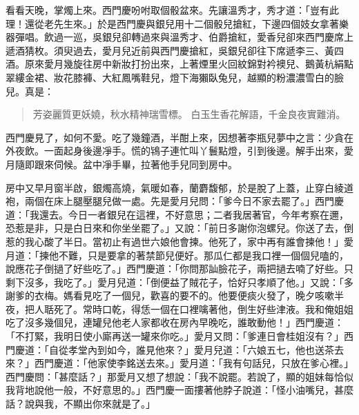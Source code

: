 看看天晚，掌燭上來。西門慶吩咐取個骰盆來。先讓溫秀才，秀才道：「豈有此理！還從老先生來。」於是西門慶與銀兒用十二個骰兒搶紅，下邊四個妓女拿著樂器彈唱。飲過一巡，吳銀兒卻轉過來與溫秀才、伯爵搶紅，愛香兒卻來西門慶席上遞酒猜枚。須臾過去，愛月兒近前與西門慶搶紅，吳銀兒卻往下席遞李三、黃四酒。原來愛月幾旋往房中新妝打扮出來，上著煙里火回紋錦對衿襖兒、鵝黃杭絹點翠縷金裙、妝花膝褲、大紅鳳嘴鞋兒，燈下海獺臥兔兒，越顯的粉濃濃雪白的臉兒。真是：
\begin{quote}
芳姿麗質更妖嬈，秋水精神瑞雪標。
白玉生香花解語，千金良夜實難消。
\end{quote}

西門慶見了，如何不愛。吃了幾鐘酒，半酣上來，因想著李瓶兒夢中之言：少貪在外夜飲。一面起身後邊凈手。慌的鴇子連忙叫丫鬟點燈，引到後邊。解手出來，愛月隨即跟來伺候。盆中凈手畢，拉著他手兒同到房中。

房中又早月窗半啟，銀燭高燒，氣暖如春，蘭麝馥郁，於是脫了上蓋，止穿白綾道袍，兩個在床上腿壓腿兒做一處。先是愛月兒問：「爹今日不家去罷了。」西門慶道：「我還去。今日一者銀兒在這裡，不好意思；二者我居著官，今年考察在邇，恐惹是非，只是白日來和你坐坐罷了。」又說：「前日多謝你泡螺兒。你送了去，倒惹的我心酸了半日。當初止有過世六娘他會揀。他死了，家中再有誰會揀他！」愛月道：「揀他不難，只是要拿的著禁節兒便好。那瓜仁都是我口裡一個個兒嗑的，說應花子倒撾了好些吃了。」西門慶道：「你問那訕臉花子，兩把撾去喃了好些。只剩下沒多，我吃了。」愛月兒道：「倒便益了賊花子，恰好只孝順了他。」又說：「多謝爹的衣梅。媽看見吃了一個兒，歡喜的要不的。他要便痰火發了，晚夕咳嗽半夜，把人聒死了。常時口乾，得恁一個在口裡噙著他，倒生好些津液。我和俺姐姐吃了沒多幾個兒，連罐兒他老人家都收在房內早晚吃，誰敢動他！」西門慶道：「不打緊，我明日使小廝再送一罐來你吃。」愛月又問：「爹連日會桂姐沒有？」西門慶道：「自從孝堂內到如今，誰見他來？」愛月兒道：「六娘五七，他也送茶去來？」西門慶道：「他家使李銘送去來。」愛月道：「我有句話兒，只放在爹心裡。」西門慶問：「甚麼話？」那愛月又想了想說：「我不說罷。若說了，顯的姐妹每恰似我背地說他一般，不好意思的。」西門慶一面摟著他脖子說道：「怪小油嘴兒，甚麼話？說與我，不顯出你來就是了。」

